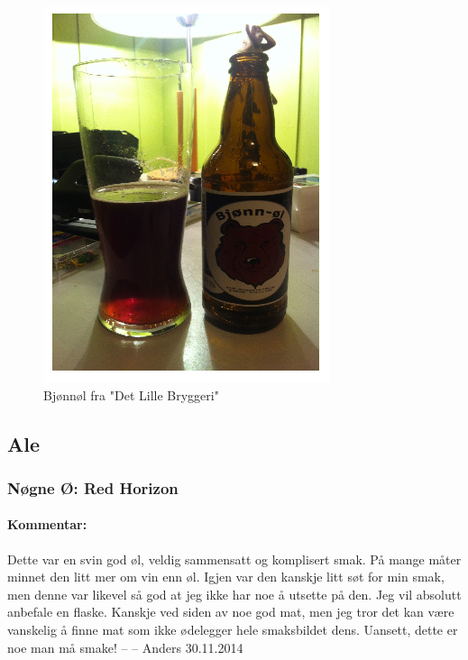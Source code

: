 \documentclass[12pt,a4paper,oneside,norsk]{article}
\begin{document}
\begin{figure} [H]
\centering
\includegraphics[scale=1.00]{Bilder/Ol/bjonnol.PNG} 
\caption{Bjønnøl fra "Det Lille Bryggeri"}
\end{figure}

\newpage
\subsection{Ale}

\subsubsection{Nøgne Ø: Red Horizon }
\paragraph{Kommentar:} Dette var en svin god øl, veldig sammensatt og komplisert smak. På mange måter minnet den litt mer om vin enn øl. Igjen var den kanskje litt søt for min smak, men denne var likevel så god at jeg ikke har noe å utsette på den. Jeg vil absolutt anbefale en flaske. Kanskje ved siden av noe god mat, men jeg tror det kan være vanskelig å finne mat som ikke ødelegger hele smaksbildet dens. Uansett, dette er noe man må smake!
\newline
-- -- Anders 30.11.2014
\end{document}
